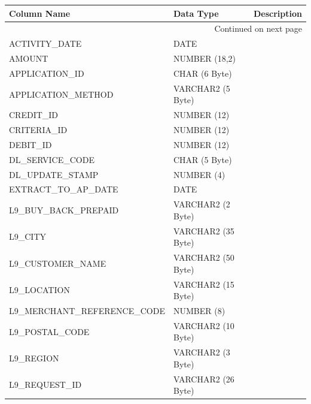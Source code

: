 \documentclass[12pt,twoside]{article}
\begin{document}
\scriptsize
\begin{longtable}{lll}

\hline
 \textbf{Column Name}           &  \textbf{Data Type}  &  \textbf{Description} \\
\hline
\endhead
\hline\multicolumn{3}{r}{Continued on next page}\
\endfoot
\endlastfoot
 ACCOUNT\_ID                    &  NUMBER (12)         &                        \\
 ACTIVITY\_DATE                 &  DATE                &                        \\
 AMOUNT                         &  NUMBER (18,2)       &                        \\
 APPLICATION\_ID                &  CHAR (6 Byte)       &                        \\
 APPLICATION\_METHOD            &  VARCHAR2 (5 Byte)   &                        \\
 CREDIT\_ID                     &  NUMBER (12)         &                        \\
 CRITERIA\_ID                   &  NUMBER (12)         &                        \\
 DEBIT\_ID                      &  NUMBER (12)         &                        \\
 DL\_SERVICE\_CODE              &  CHAR (5 Byte)       &                        \\
 DL\_UPDATE\_STAMP              &  NUMBER (4)          &                        \\
 EXTRACT\_TO\_AP\_DATE          &  DATE                &                        \\
 L9\_BUY\_BACK\_PREPAID         &  VARCHAR2 (2 Byte)   &                        \\
 L9\_CITY                       &  VARCHAR2 (35 Byte)  &                        \\
 L9\_CUSTOMER\_NAME             &  VARCHAR2 (50 Byte)  &                        \\
 L9\_LOCATION                   &  VARCHAR2 (15 Byte)  &                        \\
 L9\_MERCHANT\_REFERENCE\_CODE  &  NUMBER (8)          &                        \\
 L9\_POSTAL\_CODE               &  VARCHAR2 (10 Byte)  &                        \\
 L9\_REGION                     &  VARCHAR2 (3 Byte)   &                        \\
 L9\_REQUEST\_ID                &  VARCHAR2 (26 Byte)  &                        \\

\end{longtable}
\end{document}
